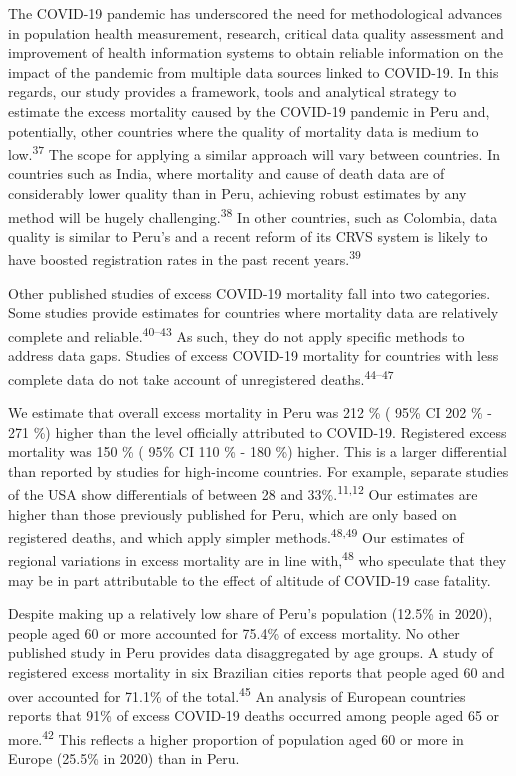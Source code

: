 \documentclass[
]{article}
\begin{document}
The COVID-19 pandemic has underscored the need for methodological advances in population health measurement, research, critical data quality assessment and improvement of health information systems to obtain reliable information on the impact of the pandemic from multiple data sources linked to COVID-19. In this regards, our study provides a framework, tools and analytical strategy to estimate the excess mortality caused by the COVID-19 pandemic in Peru and, potentially, other countries where the quality of mortality data is medium to low.\textsuperscript{37} The scope for applying a similar approach will vary between countries. In countries such as India, where mortality and cause of death data are of considerably lower quality than in Peru, achieving robust estimates by any method will be hugely challenging.\textsuperscript{38} In other countries, such as Colombia, data quality is similar to Peru's and a recent reform of its CRVS system is likely to have boosted registration rates in the past recent years.\textsuperscript{39}

Other published studies of excess COVID-19 mortality fall into two categories. Some studies provide estimates for countries where mortality data are relatively complete and reliable.\textsuperscript{40--43} As such, they do not apply specific methods to address data gaps. Studies of excess COVID-19 mortality for countries with less complete data do not take account of unregistered deaths.\textsuperscript{44--47}

We estimate that overall excess mortality in Peru was 212 \% ( 95\% CI 202 \% - 271 \%) higher than the level officially attributed to COVID-19. Registered excess mortality was 150 \% ( 95\% CI 110 \% - 180 \%) higher. This is a larger differential than reported by studies for high-income countries. For example, separate studies of the USA show differentials of between 28 and 33\%.\textsuperscript{11,12} Our estimates are higher than those previously published for Peru, which are only based on registered deaths, and which apply simpler methods.\textsuperscript{48,49} Our estimates of regional variations in excess mortality are in line with,\textsuperscript{48} who speculate that they may be in part attributable to the effect of altitude of COVID-19 case fatality.

Despite making up a relatively low share of Peru's population (12.5\% in 2020), people aged 60 or more accounted for 75.4\% of excess mortality. No other published study in Peru provides data disaggregated by age groups. A study of registered excess mortality in six Brazilian cities reports that people aged 60 and over accounted for 71.1\% of the total.\textsuperscript{45} An analysis of European countries reports that 91\% of excess COVID-19 deaths occurred among people aged 65 or more.\textsuperscript{42} This reflects a higher proportion of population aged 60 or more in Europe (25.5\% in 2020) than in Peru.
\end{document}
